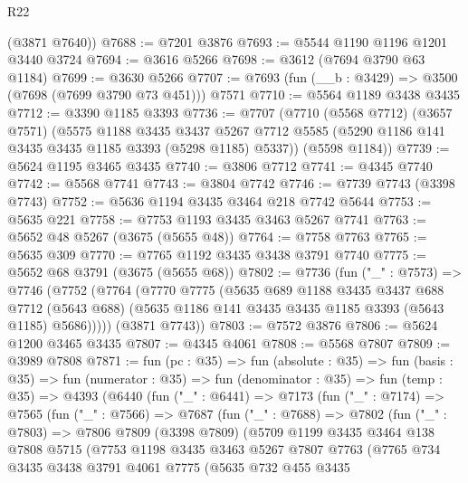 \begin{lexlean}{R22}
\begin{coremodule}
      (@3871 @7640))
@7688 := @7201 @3876
@7693 := @5544 @1190 @1196 @1201 @3440 @3724
@7694 := @3616 @5266
@7698 := @3612 (@7694 @3790 @63 @1184)
@7699 := @3630 @5266
@7707 := @7693 (fun (__b : @3429) => @3500 (@7698 (@7699 @3790 @73 @451))) @7571
@7710 := @5564 @1189 @3438 @3435
@7712 := @3390 @1185 @3393
@7736 := @7707
    (@7710
      (@5568 @7712)
      (@3657 @7571)
      (@5575
        @1188
        @3435
        @3437
        @5267
        @7712
        @5585
        (@5290 @1186 @141 @3435 @3435 @1185 @3393 (@5298 @1185) @5337))
      (@5598 @1184))
@7739 := @5624 @1195 @3465 @3435
@7740 := @3806 @7712
@7741 := @4345 @7740
@7742 := @5568 @7741
@7743 := @3804 @7742
@7746 := @7739 @7743 (@3398 @7743)
@7752 := @5636 @1194 @3435 @3464 @218 @7742 @5644
@7753 := @5635 @221
@7758 := @7753 @1193 @3435 @3463 @5267 @7741
@7763 := @5652 @48 @5267 (@3675 (@5655 @48))
@7764 := @7758 @7763
@7765 := @5635 @309
@7770 := @7765 @1192 @3435 @3438 @3791 @7740
@7775 := @5652 @68 @3791 (@3675 (@5655 @68))
@7802 := @7736
    (fun ("_" : @7573) =>
    @7746
      (@7752
        (@7764
          (@7770
            @7775
            (@5635
              @689
              @1188
              @3435
              @3437
              @688
              @7712
              (@5643 @688)
              (@5635 @1186 @141 @3435 @3435 @1185 @3393 (@5643 @1185) @5686)))))
      (@3871 @7743))
@7803 := @7572 @3876
@7806 := @5624 @1200 @3465 @3435
@7807 := @4345 @4061
@7808 := @5568 @7807
@7809 := @3989 @7808
@7871 := fun (pc : @35) =>
  fun (absolute : @35) =>
  fun (basis : @35) =>
  fun (numerator : @35) =>
  fun (denominator : @35) =>
  fun (temp : @35) =>
  @4393
    (@6440
      (fun ("_" : @6441) =>
      @7173
        (fun ("_" : @7174) =>
        @7565
          (fun ("_" : @7566) =>
          @7687
            (fun ("_" : @7688) =>
            @7802
              (fun ("_" : @7803) =>
              @7806
                @7809
                (@3398 @7809)
                (@5709
                  @1199
                  @3435
                  @3464
                  @138
                  @7808
                  @5715
                  (@7753
                    @1198
                    @3435
                    @3463
                    @5267
                    @7807
                    @7763
                    (@7765
                      @734
                      @3435
                      @3438
                      @3791
                      @4061
                      @7775
                      (@5635
                        @732
                        @455
                        @3435

\end{coremodule}
\end{lexlean}

